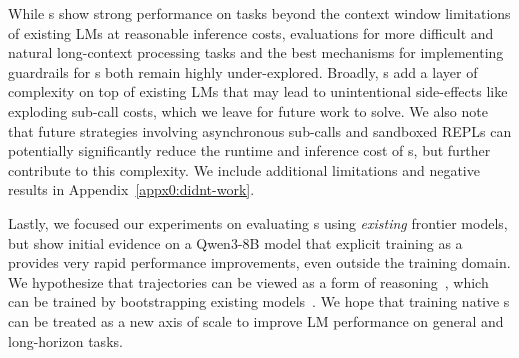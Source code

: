 While \RLM{}s show strong performance on tasks beyond the context window limitations of existing LMs at reasonable inference costs, evaluations for more difficult and natural long-context processing tasks and the best mechanisms for implementing guardrails for \RLM{}s both remain highly under-explored. Broadly, \RLM{}s add a layer of complexity on top of existing LMs that may lead to unintentional side-effects like exploding sub-call costs, which we leave for future work to solve. We also note that future strategies involving asynchronous sub-calls and sandboxed REPLs can potentially significantly reduce the runtime and inference cost of \RLM{}s, but further contribute to this complexity. We include additional limitations and negative results in Appendix~\ref{appx0:didnt-work}. 


Lastly, we focused our experiments on evaluating \RLM{}s using \textit{existing} frontier models, but show initial evidence on a Qwen3-8B model that explicit training as a \RLM{} provides very rapid performance improvements, even outside the training domain. We hypothesize that \RLM{} trajectories can be viewed as a form of reasoning~\citep{openai2024openaio1card,deepseekai2025deepseekr1incentivizingreasoningcapability}, which can be trained by bootstrapping existing models~\citep{zelikman2022starbootstrappingreasoningreasoning, zelikman2024quietstarlanguagemodelsteach}. We hope that training native \RLM{}s can be treated as a new axis of scale to improve LM performance on general and long-horizon tasks.
